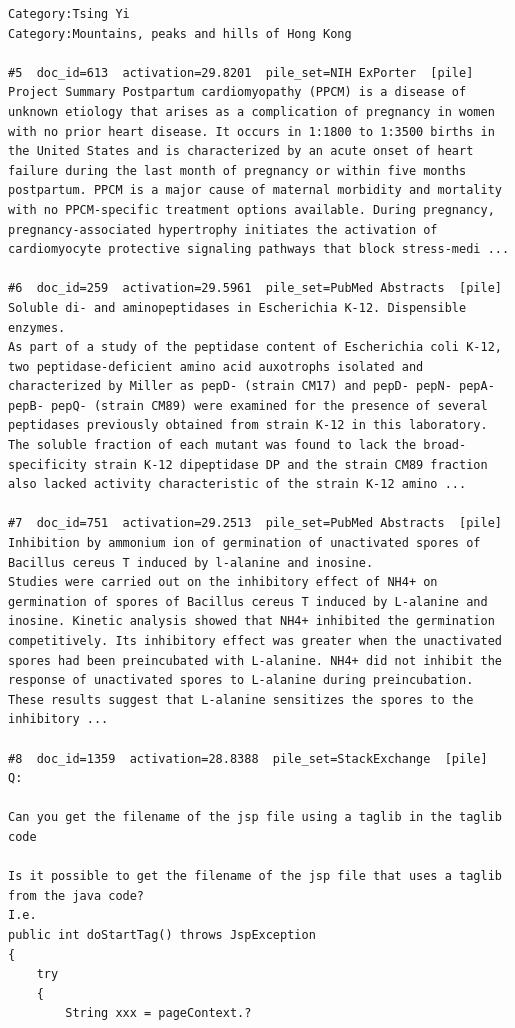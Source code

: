 \begin{verbatim}
Category:Tsing Yi
Category:Mountains, peaks and hills of Hong Kong

#5  doc_id=613  activation=29.8201  pile_set=NIH ExPorter  [pile]
Project Summary Postpartum cardiomyopathy (PPCM) is a disease of unknown etiology that arises as a complication of pregnancy in women with no prior heart disease. It occurs in 1:1800 to 1:3500 births in the United States and is characterized by an acute onset of heart failure during the last month of pregnancy or within five months postpartum. PPCM is a major cause of maternal morbidity and mortality with no PPCM-specific treatment options available. During pregnancy, pregnancy-associated hypertrophy initiates the activation of cardiomyocyte protective signaling pathways that block stress-medi ...

#6  doc_id=259  activation=29.5961  pile_set=PubMed Abstracts  [pile]
Soluble di- and aminopeptidases in Escherichia K-12. Dispensible enzymes.
As part of a study of the peptidase content of Escherichia coli K-12, two peptidase-deficient amino acid auxotrophs isolated and characterized by Miller as pepD- (strain CM17) and pepD- pepN- pepA- pepB- pepQ- (strain CM89) were examined for the presence of several peptidases previously obtained from strain K-12 in this laboratory. The soluble fraction of each mutant was found to lack the broad-specificity strain K-12 dipeptidase DP and the strain CM89 fraction also lacked activity characteristic of the strain K-12 amino ...

#7  doc_id=751  activation=29.2513  pile_set=PubMed Abstracts  [pile]
Inhibition by ammonium ion of germination of unactivated spores of Bacillus cereus T induced by l-alanine and inosine.
Studies were carried out on the inhibitory effect of NH4+ on germination of spores of Bacillus cereus T induced by L-alanine and inosine. Kinetic analysis showed that NH4+ inhibited the germination competitively. Its inhibitory effect was greater when the unactivated spores had been preincubated with L-alanine. NH4+ did not inhibit the response of unactivated spores to L-alanine during preincubation. These results suggest that L-alanine sensitizes the spores to the inhibitory ...

#8  doc_id=1359  activation=28.8388  pile_set=StackExchange  [pile]
Q:

Can you get the filename of the jsp file using a taglib in the taglib code

Is it possible to get the filename of the jsp file that uses a taglib from the java code?
I.e.
public int doStartTag() throws JspException 
{
    try
    {
        String xxx = pageContext.?


\end{verbatim}
